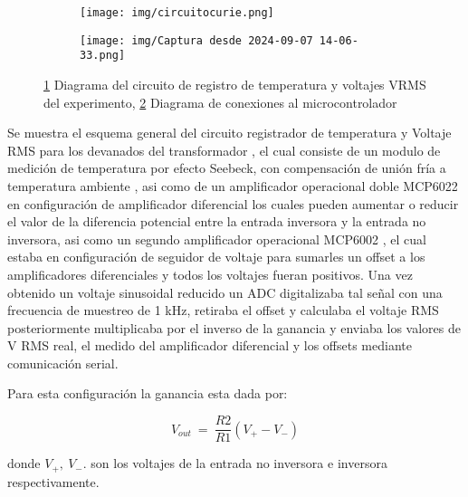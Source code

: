 
\vspace{\baselineskip}

\begin{figure}[H]
    \centering
    \begin{subfigure}[b]{0.48\textwidth}
        \centering
        \texttt{[image: img/circuitocurie.png]}
        \label{fig:subfigura1}
    \end{subfigure}
    \hfill
    \begin{subfigure}[b]{0.48\textwidth}
        \centering
        \texttt{[image: img/Captura desde 2024-09-07 14-06-33.png]}
        \label{fig:subfigura2}
    \end{subfigure}
    \caption{\ref{fig:subfigura1} Diagrama del circuito de registro de temperatura y voltajes VRMS del experimento, \ref{fig:subfigura2} Diagrama de conexiones al microcontrolador }
    \label{fig:schematic}
\end{figure}

Se muestra el esquema general del circuito registrador de temperatura y Voltaje RMS para los devanados del transformador , el cual consiste de un modulo de medición de temperatura por efecto Seebeck, con compensación de unión fría a temperatura ambiente \cite{MAX6675}, asi como de un amplificador operacional doble MCP6022  \cite{MCP6022} en configuración de amplificador diferencial los cuales pueden aumentar o reducir el valor de la diferencia potencial entre la entrada inversora y la entrada no inversora, asi como un segundo amplificador operacional MCP6002  \cite{MCP6002}, el cual estaba en configuración de seguidor de voltaje para sumarles un offset a los amplificadores diferenciales y todos los voltajes fueran positivos. Una vez obtenido un voltaje sinusoidal reducido un ADC digitalizaba tal señal con una frecuencia de muestreo de 1 kHz, retiraba el offset y calculaba el voltaje RMS posteriormente multiplicaba por el inverso de la ganancia y enviaba los valores de V RMS real, el medido del amplificador diferencial y los offsets mediante comunicación serial. 

Para esta configuración la ganancia esta dada por:

\begin{equation}
\label{eq:gain}
    V_{out}\ =\ \frac{R2}{R1}(V_{+} - V_{-})
\end{equation}

{\noindent \fontsize{7}{6}\selectfont donde $V_{+},\ V_{-}$. son los voltajes de la entrada no inversora e inversora respectivamente}.

